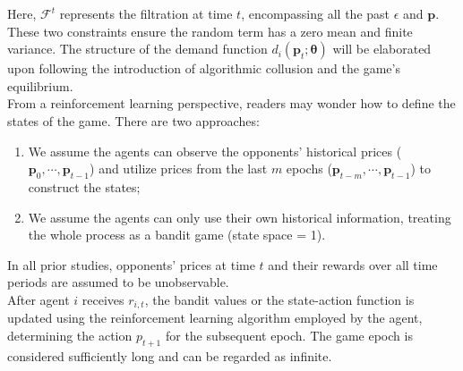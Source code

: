 \documentclass[12pt]{article}
\begin{document}
Here, $\mathcal{F}^t$ represents the filtration at time $t$, encompassing all the past $\epsilon$ and $\boldsymbol{p}$. These two constraints ensure the random term has a zero mean and finite variance.  The structure of the demand function $d_{i}(\boldsymbol{p}_t;\boldsymbol{\theta})$ will be elaborated upon following the introduction of algorithmic collusion and the game's equilibrium.\\

From a reinforcement learning perspective, readers may wonder how to define the states of the game. There are two approaches:
\begin{enumerate}
    \item We assume the agents can observe the opponents' historical prices ($\boldsymbol{p}_{0}, \cdots, \boldsymbol{p}_{t-1}$) and utilize prices from the last $m$ epochs ($\boldsymbol{p}_{t-m}, \cdots, \boldsymbol{p}_{t-1}$) to construct the states;
    \item We assume the agents can only use their own historical information, treating the whole process as a bandit game (state space = 1).
\end{enumerate}

In all prior studies, opponents' prices at time $t$ and their rewards over all time periods are assumed to be unobservable.\\

After agent $i$ receives $r_{i,t}$, the bandit values or the state-action function is updated using the reinforcement learning algorithm employed by the agent, determining the action $p_{t+1}$ for the subsequent epoch. The game epoch is considered sufficiently long and can be regarded as infinite.\\
\end{document}
